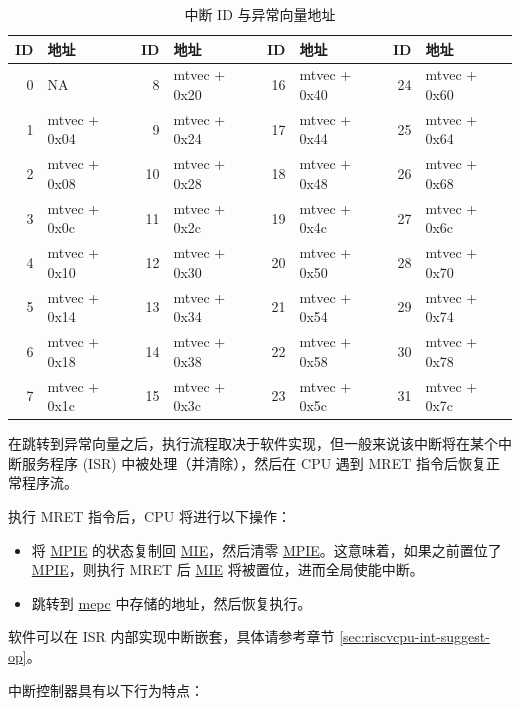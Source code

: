 \documentclass[main\_\_CN.tex]{subfiles}
\begin{document}
\begin{longtable}{ | r | l || r | l || r | l || r | l | }
\caption{中断 ID 与异常向量地址} \label{tab:riscvcpu-int-isr-addr-map}
\\ \hline
\rowcolor{lightgray}
ID & 地址 & ID & 地址 & ID & 地址 & ID & 地址 \\ \hline
 0 & NA           &  8 & mtvec + 0x20 & 16 & mtvec + 0x40 & 24 & mtvec + 0x60   \\ \hline
 1 & mtvec + 0x04 &  9 & mtvec + 0x24 & 17 & mtvec + 0x44 & 25 & mtvec + 0x64   \\ \hline
 2 & mtvec + 0x08 & 10 & mtvec + 0x28 & 18 & mtvec + 0x48 & 26 & mtvec + 0x68   \\ \hline
 3 & mtvec + 0x0c & 11 & mtvec + 0x2c & 19 & mtvec + 0x4c & 27 & mtvec + 0x6c   \\ \hline
 4 & mtvec + 0x10 & 12 & mtvec + 0x30 & 20 & mtvec + 0x50 & 28 & mtvec + 0x70   \\ \hline
 5 & mtvec + 0x14 & 13 & mtvec + 0x34 & 21 & mtvec + 0x54 & 29 & mtvec + 0x74   \\ \hline
 6 & mtvec + 0x18 & 14 & mtvec + 0x38 & 22 & mtvec + 0x58 & 30 & mtvec + 0x78   \\ \hline
 7 & mtvec + 0x1c & 15 & mtvec + 0x3c & 23 & mtvec + 0x5c & 31 & mtvec + 0x7c   \\ \hline
\end{longtable}

在跳转到异常向量之后，执行流程取决于软件实现，但一般来说该中断将在某个中断服务程序 (ISR) 中被处理（并清除），然后在 CPU 遇到 MRET 指令后恢复正常程序流。

执行 MRET 指令后，CPU 将进行以下操作：
\begin{itemize}
    \item 将 \hyperref[fielddesc:MSTATUSMPIE]{MPIE} 的状态复制回 \hyperref[fielddesc:MSTATUSMIE]{MIE}，然后清零 \hyperref[fielddesc:MSTATUSMPIE]{MPIE}。这意味着，如果之前置位了 \hyperref[fielddesc:MSTATUSMPIE]{MPIE}，则执行 MRET 后 \hyperref[fielddesc:MSTATUSMIE]{MIE} 将被置位，进而全局使能中断。
    \item 跳转到 \hyperref[regdesc:MEPC]{mepc} 中存储的地址，然后恢复执行。
\end{itemize}

软件可以在 ISR 内部实现中断嵌套，具体请参考章节 \ref{sec:riscvcpu-int-suggest-op}。

中断控制器具有以下行为特点：
\end{document}
